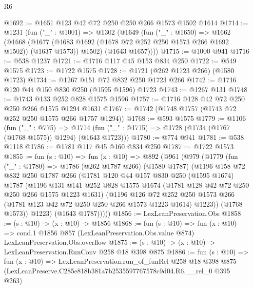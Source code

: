 \begin{lexlean}{R6}
\begin{coremodule}
@1692 := @1651 @123 @42 @72 @250 @250 @266 @1573 @1502 @1614
@1714 := @1231
    (fun ("_" : @1001) =>
    @1302
      (@1649
        (fun ("_" : @1650) =>
        @1662
          (@1668
            (@1677 (@1683 @1692 (@1678 @72 @252 @250 @1573 @266 @1692 @1502)) (@1637 @1573))
            @1502)
          (@1643 @1657))))
@1715 := @1000 @941
@1716 := @538 @1237
@1721 := @1716 @117 @45 @153 @834 @250
@1722 := @549 @1575
@1723 := @1722 @1575
@1728 := @1721 (@262 @1723 @266) (@1580 @1723)
@1734 := @1267 @151 @72 @832 @250 @1723 @266
@1742 := @1716 @120 @44 @150 @830 @250 (@1595 @1596) @1723
@1743 := @1267 @131
@1748 := @1743 @133 @252 @828 @1575 @1596
@1757 := @1716 @128 @42 @72 @250 @250 @266 @1575 @1294 @1631
@1767 := @1742 (@1748 @1757 (@1743 @72 @252 @250 @1575 @266 @1757 @1294))
@1768 := @593 @1575
@1779 := @1106
    (fun ("_" : @775) =>
    @1714 (fun ("_" : @1715) => @1728 (@1734 (@1767 (@1768 @1575)) @1294) (@1643 @1723)))
@1780 := @774 @941
@1781 := @538 @1118
@1786 := @1781 @117 @45 @160 @834 @250
@1787 := @1722 @1573
@1855 := fun (s : @10) =>
  fun (x : @10) =>
  @892
    (@961
      (@979
        (@1779
          (fun ("_" : @1780) =>
          @1786
            (@262 @1787 @266)
            (@1580 @1787)
            (@1196
              @158
              @72
              @832
              @250
              @1787
              @266
              (@1781
                @120
                @44
                @157
                @830
                @250
                (@1595 @1674)
                @1787
                (@1196
                  @131
                  @141
                  @252
                  @828
                  @1575
                  @1674
                  (@1781 @128 @42 @72 @250 @250 @266 @1575 @1223 @1631)
                  (@1196
                    @126
                    @72
                    @252
                    @250
                    @1573
                    @266
                    (@1781 @123 @42 @72 @250 @250 @266 @1573 @1223 @1614)
                    @1223))
                (@1768 @1573))
              @1223)
            (@1643 @1787)))))
@1856 := LexLeanPreservation.Obs
@1858 := (s : @10) -> (x : @10) -> @1856
@1868 := fun (s : @10) =>
  fun (x : @10) =>
  cond.{1} @1856 @857 (LexLeanPreservation.Obs.value @874) LexLeanPreservation.Obs.overflow
@1875 := (s : @10) -> (x : @10) -> LexLeanPreservation.RunConv @258 @18 @398 @875
@1886 := fun (s : @10) =>
  fun (x : @10) =>
  LexLeanPreservation.run_of_funRel
    @258
    @18
    @398
    @875
    (LexLeanPreserve.C285e818b381a7b2535597767578c9d04.R6.__rel_0 @395 @263)
\end{coremodule}
\end{lexlean}
